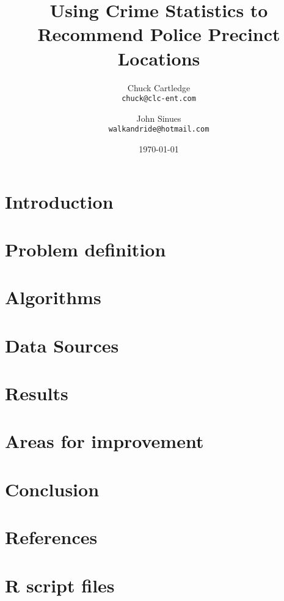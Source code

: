 \documentclass[12pt]{article}
\title{Using Crime Statistics to Recommend Police Precinct Locations}
\author{Chuck Cartledge\\
  \texttt{chuck@clc-ent.com}
  \and
  John Sinues\\
\texttt{walkandride@hotmail.com}}
\date{\today}
\begin{document}
\maketitle
{}
\tableofcontents
\listofalgorithms
\listoffigures
\cleardoublepage
\thispagestyle{empty}
\pagestyle{plain}
\setcounter{page}{1}
\section{Introduction}

\section{Problem definition}

\section{Algorithms}

\section{Data Sources}

\section{Results}

\section{Areas for improvement}

\section{Conclusion}

\section{References}

\appendix
\section{R script files}

\end{document}
